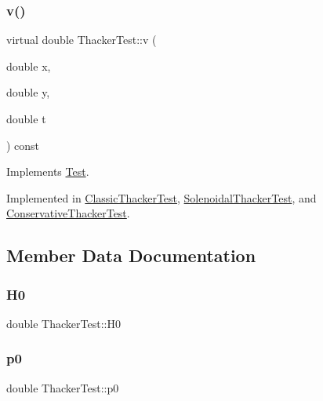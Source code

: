 \mbox{\label{classThackerTest_a445339d59012efde1e6d27ab060b6781}} 
\subsubsection{\texorpdfstring{v()}{v()}}
{\footnotesize\ttfamily virtual double Thacker\+Test\+::v (\begin{DoxyParamCaption}\item[{double}]{x,  }\item[{double}]{y,  }\item[{double}]{t }\end{DoxyParamCaption}) const\hspace{0.3cm}{\ttfamily [pure virtual]}}



Implements \hyperlink{classTest_a9a2696e671a1903b0dd3c84178e3f73f}{Test}.



Implemented in \hyperlink{classClassicThackerTest_a7dcad970cbd5afaec513109e701075e8}{Classic\+Thacker\+Test}, \hyperlink{classSolenoidalThackerTest_a87487f308128e5ca961481dd75da6abf}{Solenoidal\+Thacker\+Test}, and \hyperlink{classConservativeThackerTest_ada42cdb161739dc9b831eac7af8312a3}{Conservative\+Thacker\+Test}.



\subsection{Member Data Documentation}
\mbox{\label{classThackerTest_a7a951789e0eee6467ef9bd5f371ba7bf}} 
\subsubsection{\texorpdfstring{H0}{H0}}
{\footnotesize\ttfamily double Thacker\+Test\+::\+H0\hspace{0.3cm}{\ttfamily [protected]}}

\mbox{\label{classThackerTest_a05f901f7541aab19669ed7f50edd8e22}} 
\subsubsection{\texorpdfstring{p0}{p0}}
{\footnotesize\ttfamily double Thacker\+Test\+::p0\hspace{0.3cm}{\ttfamily [protected]}}

